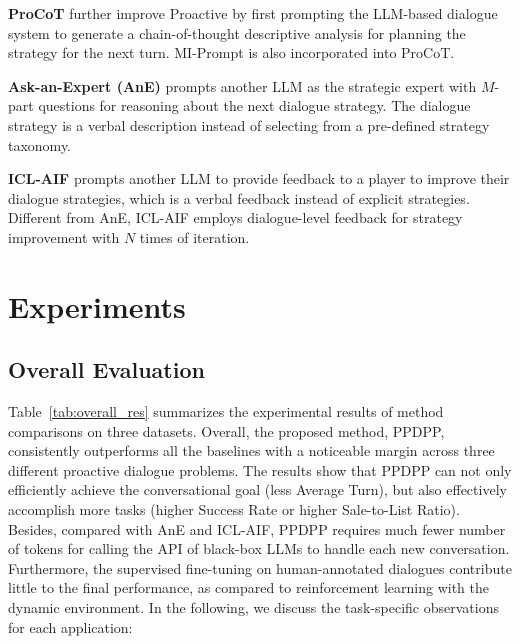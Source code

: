 \documentclass{article} %
\begin{document}
\noindent \textbf{ProCoT} \citet{llm-proactive} further improve Proactive by first prompting the LLM-based dialogue system to generate a chain-of-thought descriptive analysis for planning the strategy for the next turn. MI-Prompt is also incorporated into ProCoT. 

\noindent \textbf{Ask-an-Expert (AnE)} \citep{acl23-askanexpert} prompts another LLM as the strategic expert with $M$-part questions for reasoning about the next dialogue strategy. The dialogue strategy is a verbal description instead of selecting from a pre-defined strategy taxonomy. 

\noindent \textbf{ICL-AIF} \citep{negotiate-selfplay} prompts another LLM to provide feedback to a player to improve their dialogue strategies, which is a verbal feedback instead of explicit strategies. Different from AnE, ICL-AIF employs dialogue-level feedback for strategy improvement with $N$ times of iteration.  



 


\section{Experiments}




\subsection{Overall Evaluation}\label{exp:result}


Table~\ref{tab:overall_res} summarizes the experimental results of method comparisons on three datasets. Overall, the proposed method, PPDPP, consistently outperforms all the baselines with a noticeable margin across three different proactive dialogue problems. The results show that PPDPP can not only efficiently achieve the conversational goal (less Average Turn), but also effectively accomplish more tasks (higher Success Rate or higher Sale-to-List Ratio). 
Besides, compared with AnE and ICL-AIF, PPDPP requires much fewer number of tokens for calling the API of black-box LLMs to handle each new conversation. 
Furthermore, the supervised fine-tuning on human-annotated dialogues contribute little to the final performance, as compared to reinforcement learning with the dynamic environment. 
In the following, we discuss the task-specific observations for each application:
\end{document}
